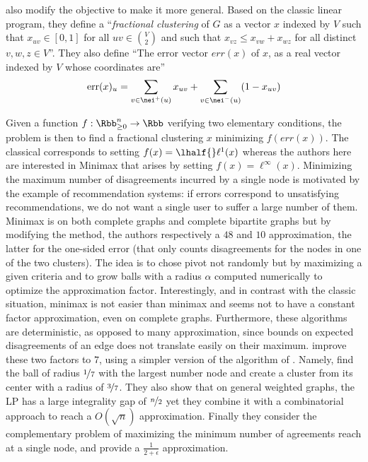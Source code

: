 \Textcite{pmlr-v48-puleo16} also modify the \mind{} objective to make it more general. Based on the
classic \pcc{} linear program, they define a \enquote{\emph{fractional clustering} of $G$ as a
vector $x$ indexed by $V$ such that $x_{uv} \in [0, 1]$ for all $uv \in \binom{V}{2}$ and such that
$x_{vz} \leq x_{vw} + x_{wz}$ for all distinct $v, w, z \in V$}. They also define \enquote{The
error vector $err(x)$ of $x$, as a real vector indexed by $V$ whose coordinates are}
\begin{equation*}
  \mathrm{err}(x)_u = \sum_{v\in\nei^+(u)} x_{uv} + \sum_{v\in\nei^-(u)} (1-x_{uv})
\end{equation*}

Given a function $f: \Rbb^n_{\geq 0} \rightarrow \Rbb$ verifying two elementary conditions, the
problem is then to find a fractional clustering $x$ minimizing $f(err(x))$. The classical \pcc{}
corresponds to setting $f(x) = \lhalf{}\ell^1(x)$ whereas the authors here are interested in Minimax
\pcc{} that arises by setting $f(x) = \ell^\infty(x)$. Minimizing the maximum number of
disagreements incurred by a single node is motivated by the example of recommendation systems: if
errors correspond to unsatisfying recommendations, we do not want a single user to suffer a large
number of them. Minimax \pcc{} is \NPc{} on both complete graphs and complete bipartite graphs but
by modifying the \regionGrow{} method, the authors respectively a $48$ and
$10$ approximation, the latter for the one-sided error (that only counts disagreements for the nodes
in one of the two clusters).
The idea is to chose pivot not randomly but by maximizing a given criteria and
to grow balls with a radius $\alpha$ computed numerically to optimize the approximation factor.
Interestingly, and in contrast with the classic \pcc{} situation, minimax \maxa{} is not easier than
minimax \mind{} and seems not to have a constant factor approximation, even on complete graphs.
Furthermore, these algorithms are deterministic, as opposed to many \pcc{} approximation, since
bounds on expected disagreements of an edge does not translate easily on their maximum.
\Textcite{Charikar2017} improve these two factors to $7$, using a simpler version of the algorithm
of \textcite{pmlr-v48-puleo16}. Namely, find the ball of radius $\nicefrac{1}{7}$ with the largest
number node and create a cluster from its center with a radius of $\nicefrac{3}{7}$. They also show
that on general weighted graphs, the LP has a large integrality gap of $\nicefrac{n}{2}$ yet they
combine it with a combinatorial approach to reach a $O(\sqrt{n})$ approximation. Finally they
consider the complementary problem of maximizing the minimum number of agreements reach at a single
node, and provide a $\frac{1}{2+\epsilon}$ approximation.

